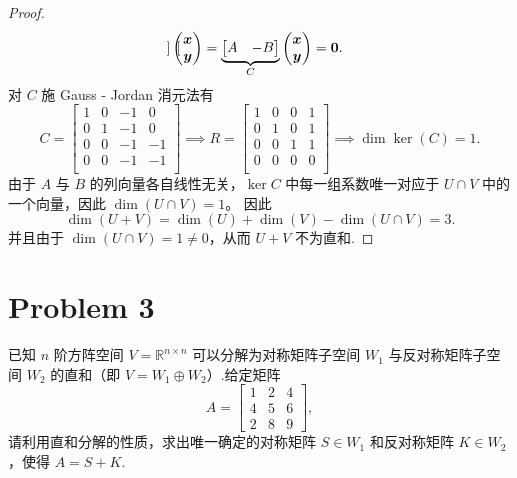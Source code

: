 \begin{proof}
\[\begin{bmatrix}
\end{bmatrix} \begin{pmatrix}
    \boldsymbol{x} \\
    \boldsymbol{y}
\end{pmatrix} = \underbrace{\begin{bmatrix}
    A & -B
\end{bmatrix}}_{C} \begin{pmatrix}
    \boldsymbol{x} \\
    \boldsymbol{y} \\
\end{pmatrix} = \boldsymbol{0}.
\]
对 $C$ 施 Gauss - Jordan 消元法有
\[
C = \begin{bmatrix}
    1 & 0 & -1 & 0 \\
    0 & 1 & -1 & 0 \\
    0 & 0 & -1 & -1 \\
    0 & 0 & -1 & -1 \\
\end{bmatrix}
\implies
R = \begin{bmatrix}
    1 & 0 & 0 & 1 \\
    0 & 1 & 0 & 1 \\
    0 & 0 & 1 & 1 \\
    0 & 0 & 0 & 0 \\
\end{bmatrix}
\implies \dim \ker \left(C\right) = 1.
\]
由于 $A$ 与 $B$ 的列向量各自线性无关，$\ker C$ 中每一组系数唯一对应于 $U\cap V$ 中的一个向量，因此 $\dim(U\cap V)=1$。
因此
\[
\dim \left(U + V\right) = \dim \left(U\right) + \dim \left(V\right) - \dim \left(U \cap V\right) = 3.
\]
并且由于 $\dim \left(U \cap V\right) = 1 \neq 0$，从而 $U + V$ 不为直和.


\end{proof}
\section*{Problem 3}

已知 $n$ 阶方阵空间 $V = \mathbb{R}^{n \times n}$ 可以分解为对称矩阵子空间 $W_1$ 与反对称矩阵子空间 $W_2$ 的直和（即 $V = W_1 \oplus W_2$）.给定矩阵
\[
A =
\begin{bmatrix}
1 & 2 & 4 \\
4 & 5 & 6 \\
2 & 8 & 9
\end{bmatrix},
\]
请利用直和分解的性质，求出唯一确定的对称矩阵 $S \in W_1$ 和反对称矩阵 $K \in W_2$，使得 $A = S + K$.

